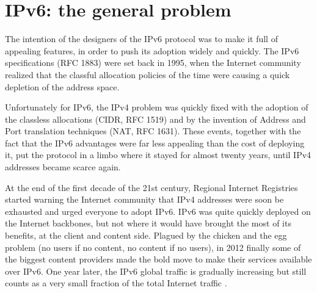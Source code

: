 \section{IPv6: the general problem}

The intention of the designers of the IPv6 protocol was to make it full of appealing features, in order to push its adoption widely and quickly. The IPv6 specifications (RFC 1883) were set back in 1995, when the Internet community realized that the classful allocation policies of the time were causing a quick depletion of the address space. 
\par
Unfortunately for IPv6, the IPv4 problem was quickly fixed with the adoption of the classless allocations (CIDR, RFC 1519) and by the invention of Address and Port translation techniques (NAT, RFC 1631). These events, together with the fact that the IPv6 advantages were far less appealing than the cost of deploying it, put the protocol in a limbo where it stayed for almost twenty years, until IPv4 addresses became scarce again.
\par
At the end of the first decade of the 21st century, Regional Internet Registries started warning the Internet community that IPv4 addresses were soon be exhausted and urged everyone to adopt IPv6. IPv6 was quite quickly deployed on the Internet backbones, but not where it would have brought the most of its benefits, at the client and content side. 
Plagued by the chicken and the egg problem (no users if no content, no content if no users), in 2012 finally some of the 
biggest content providers made the bold move to make their services available over IPv6. 
One year later, the IPv6 global traffic is gradually increasing but still counts as a very small fraction of the 
total Internet traffic \cite{ipv6stat}.

